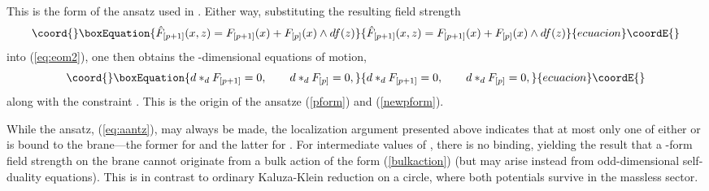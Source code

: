 \documentclass[a4paper,12pt]{article}
\def\fft#1#2{{#1\over#2}}
\begin{document}
%
This is the form of the ansatz used in \cite{lupope,Cvetic:2000gj}.
Either way, substituting
the resulting field strength
%
\begin{equation}\coord{}\boxEquation{
\hat F_{[p+1]}(x,z)=F_{[p+1]}(x)+F_{[p]}(x)\wedge df(z)
}{
\hat F_{[p+1]}(x,z)=F_{[p+1]}(x)+F_{[p]}(x)\wedge df(z)
}{ecuacion}\coordE{}\end{equation}
%
into (\ref{eq:eom2}), one then obtains the \coordHE{}-dimensional equations of
motion,
%
\begin{equation}\coord{}\boxEquation{
d*_dF_{[p+1]}=0,\qquad d*_dF_{[p]}=0,
}{
d*_dF_{[p+1]}=0,\qquad d*_dF_{[p]}=0,
}{ecuacion}\coordE{}\end{equation}
%
along with the constraint \myHighlight{$f'(z)=e^{-2\left(p-\fft{d}2\right)k|z|}$}\coordHE{}.  This is
the origin of the ansatze (\ref{pform}) and (\ref{newpform}).

While the ansatz, (\ref{eq:aantz}), may always be made, the localization
argument presented above indicates that at most only one of either \coordHE{}
or \coordHE{} is bound to the brane---the former for \coordHE{} and the
latter for \coordHE{}.  For intermediate values of \coordHE{}, there is no binding,
yielding the result that a \coordHE{}-form field strength on the brane cannot
originate from a bulk action of the form (\ref{bulkaction}) (but may arise
instead from odd-dimensional self-duality equations).  This is in contrast
to ordinary Kaluza-Klein reduction on a circle, where both potentials
survive in the massless sector.
\end{document}
